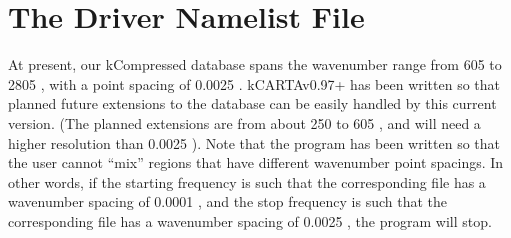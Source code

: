 \documentclass[12pt]{article}
\begin{document}
\section{The Driver Namelist File}

At present, our kCompressed database spans the wavenumber range from 
605 \wn to 2805 \wn, with a point spacing of 0.0025 \wn. kCARTAv0.97+ has
been written so that planned future extensions to the database can be 
easily handled by this current version. (The planned extensions are from
about 250 \wn to 605 \wn, and will need a higher resolution than  0.0025 \wn).
Note that the program has been written so that the user cannot ``mix'' regions
that have different wavenumber point spacings. In other words, if the starting 
frequency is such that the corresponding file has a wavenumber spacing of 
0.0001 \wn, and the stop frequency is such that the corresponding file has a 
wavenumber spacing of 0.0025 \wn, the program will stop.
\end{document}
